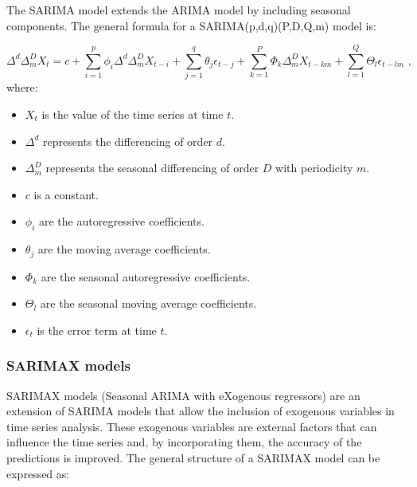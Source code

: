 The SARIMA model extends the ARIMA model by including seasonal components. The general formula for a SARIMA(p,d,q)(P,D,Q,m) model is:

\begin{equation}
\Delta^d \Delta_m^D X_t = c + \sum_{i=1}^{p} \phi_i \Delta^d \Delta_m^D X_{t-i} + \sum_{j=1}^{q} \theta_j \epsilon_{t-j} + \sum_{k=1}^{P} \Phi_k \Delta_m^D X_{t-km} + \sum_{l=1}^{Q} \Theta_l \epsilon_{t-lm} \text{ ,}
\end{equation}where:
\begin{itemize}
    \item \( X_t \) is the value of the time series at time \( t \).
    \item \( \Delta^d \) represents the differencing of order \( d \).
    \item \( \Delta_m^D \) represents the seasonal differencing of order \( D \) with periodicity \( m \).
    \item \( c \) is a constant.
    \item \( \phi_i \) are the autoregressive coefficients.
    \item \( \theta_j \) are the moving average coefficients.
    \item \( \Phi_k \) are the seasonal autoregressive coefficients.
    \item \( \Theta_l \) are the seasonal moving average coefficients.
    \item \( \epsilon_t \) is the error term at time \( t \).
\end{itemize}
\vspace{10pt}

\subsubsection{SARIMAX models}

SARIMAX models (Seasonal ARIMA with eXogenous regressors) are an extension of SARIMA models that allow the inclusion of exogenous variables in time series analysis. These exogenous variables are external factors that can influence the time series and, by incorporating them, the accuracy of the predictions is improved. The general structure of a SARIMAX model can be expressed as:

